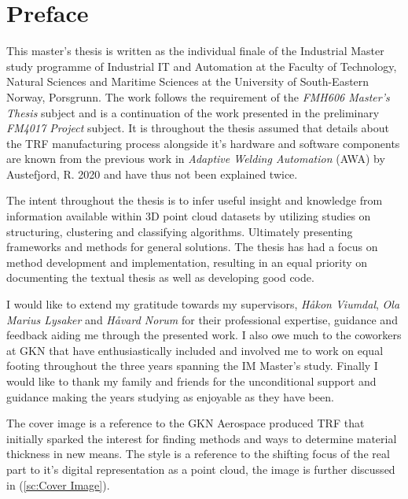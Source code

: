 \documentclass[%
]{USN-MSc}
\begin{document}
\chapter*{Preface}
\label{ch:preface}



This master's thesis is written as the individual finale of the Industrial Master study programme of Industrial IT and Automation at the Faculty of Technology, Natural Sciences and Maritime Sciences at the University of South-Eastern Norway, Porsgrunn. The work follows the requirement of the \textit{FMH606 Master's Thesis} subject and is a continuation of the work presented in the preliminary \textit{FM4017 Project} subject. It is throughout the thesis assumed that details about the TRF manufacturing process alongside it's hardware and software components are known from the previous work in \textit{Adaptive Welding Automation} (AWA) by Austefjord, R. 2020 \cite{Adaptive-Welding-Automation} and have thus not been explained twice.

The intent throughout the thesis is to infer useful insight and knowledge from information available within 3D point cloud datasets by utilizing studies on structuring, clustering and classifying algorithms. Ultimately presenting frameworks and methods for general solutions. The thesis has had a focus on method development and implementation, resulting in an equal priority on documenting the textual thesis as well as developing good code.

I would like to extend my gratitude towards my supervisors, \textit{Håkon Viumdal}, \textit{Ola Marius Lysaker} and \textit{Håvard Norum} for their professional expertise, guidance and feedback aiding me through the presented work. I also owe much to the coworkers at GKN that have enthusiastically included and involved me to work on equal footing throughout the three years spanning the IM Master's study. Finally I would like to thank my family and friends for the unconditional support and guidance making the years studying as enjoyable as they have been. 


The cover image is a reference to the GKN Aerospace produced TRF that initially sparked the interest for finding methods and ways to determine material thickness in new means. The style is a reference to the shifting focus of the real part to it's digital representation as a point cloud, the image is further discussed in (\ref{sc:Cover Image}).
\end{document}
